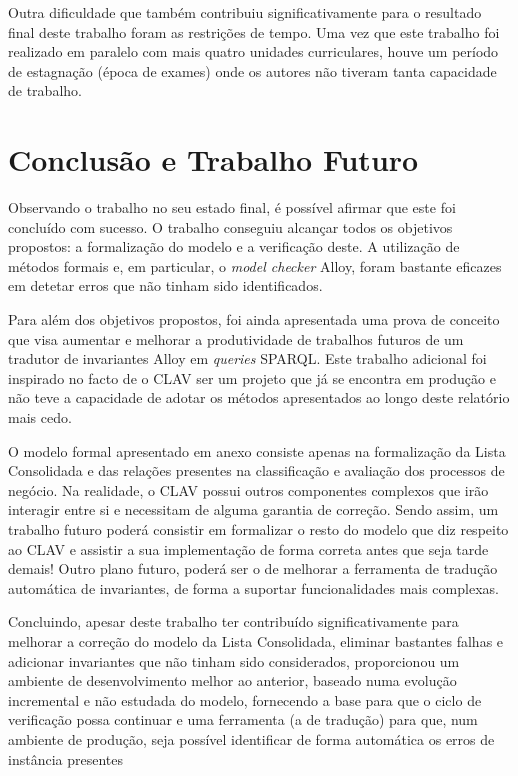 \documentclass[tikz,runningheads,a4paper]{llncs}
\begin{document}
Outra dificuldade que também contribuiu significativamente para o resultado final deste trabalho foram as restrições de tempo. Uma vez que este trabalho foi realizado em paralelo com mais quatro unidades curriculares, houve um período de estagnação (época de exames) onde os autores não tiveram tanta capacidade de trabalho.

\section{Conclusão e Trabalho Futuro} \label{SecConclusion}

Observando o trabalho no seu estado final, é possível afirmar que este foi concluído com sucesso. O trabalho conseguiu alcançar todos os objetivos propostos: a formalização do modelo e a verificação deste. A utilização de métodos formais e, em particular, o \textit{model checker} Alloy, foram bastante eficazes em detetar erros que não tinham sido identificados.

Para além dos objetivos propostos, foi ainda apresentada uma prova de conceito que visa aumentar e melhorar a produtividade de trabalhos futuros de um tradutor de invariantes Alloy em \textit{queries} SPARQL. Este trabalho adicional foi inspirado no facto de o CLAV ser um projeto que já se encontra em produção e não teve a capacidade de adotar os métodos apresentados ao longo deste relatório mais cedo.

O modelo formal apresentado em anexo consiste apenas na formalização da Lista Consolidada e das relações presentes na classificação e avaliação dos processos de negócio. Na realidade, o CLAV possui outros componentes complexos que irão interagir entre si e necessitam de alguma garantia de correção. Sendo assim, um trabalho futuro poderá consistir em formalizar o resto do modelo que diz respeito ao CLAV e assistir a sua implementação de forma correta antes que seja tarde demais! Outro plano futuro, poderá ser o de melhorar a ferramenta de tradução automática de invariantes, de forma a suportar funcionalidades mais complexas.

Concluindo, apesar deste trabalho ter contribuído significativamente para melhorar a correção do modelo da Lista Consolidada, eliminar bastantes falhas e adicionar invariantes que não tinham sido considerados, proporcionou um ambiente de desenvolvimento melhor ao anterior, baseado numa evolução incremental e não estudada do modelo, fornecendo a base para que o ciclo de verificação possa continuar e uma ferramenta (a de tradução) para que, num ambiente de produção, seja possível identificar de forma automática os erros de instância presentes
\end{document}
